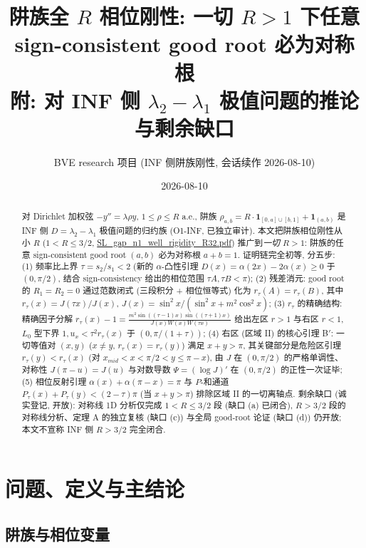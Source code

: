 \documentclass[UTF8]{ctexart}
\title{阱族全 $R$ 相位刚性: 一切 $R>1$ 下任意 sign-consistent good root 必为对称根\\[-2mm]
\large 附: 对 INF 侧 $\lambda_2-\lambda_1$ 极值问题的推论与剩余缺口}
\author{BVE research 项目 (INF 侧阱族刚性, 会话续作 2026-08-10)}
\date{2026-08-10}
\begin{document}
\maketitle

\begin{abstract}
对 Dirichlet 加权弦 $-y''=\lambda\rho y$, $1\le\rho\le R$ a.e., 阱族
$\rho_{a,b}=R\cdot\mathbf 1_{[0,a]\cup[b,1]}+\mathbf 1_{(a,b)}$ 是 INF 侧 $D=\lambda_2-\lambda_1$
极值问题的归约族 (O1-INF, 已独立审计). 本文把阱族相位刚性从小 $R$ ($1<R\le3/2$,
\url{SL\_gap\_n1\_well\_rigidity\_R32.pdf}) 推广到\emph{一切} $R>1$:
阱族的任意 sign-consistent good root $(a,b)$ 必为对称根 $a+b=1$.
证明链完全初等, 分五步:
(1) 频率比上界 $\tau=s_2/s_1<2$ (新的 $\alpha$-凸性引理 $D(x)=\alpha(2x)-2\alpha(x)\ge0$ 于
$(0,\pi/2)$, 结合 sign-consistency 给出的相位范围 $\tau A,\tau B<\pi$);
(2) 残差消元: good root 的 $R_1=R_2=0$ 通过范数闭式 (三段积分 + 相位恒等式) 化为
$r_\tau(A)=r_\tau(B)$, 其中 $r_\tau(x)=J(\tau x)/J(x)$, $J(x)=\sin^2x/(\sin^2x+m^2\cos^2x)$;
(3) $r_\tau$ 的精确结构: 精确因子分解
$r_\tau(x)-1=\frac{m^2\sin((\tau-1)x)\sin((\tau+1)x)}{J(x)W(x)W(\tau x)}$ 给出左区 $r>1$ 与右区 $r<1$,
$L_0$ 型下界 $1,u_x<\tau^2r_\tau(x)$ 于 $(0,\pi/(1+\tau))$;
(4) 右区 (区域 II) 的核心引理 B$'$: 一切等值对 $(x,y)$ ($x\ne y$, $r_\tau(x)=r_\tau(y)$) 满足
$x+y>\pi$, 其关键部分是危险区引理 $r_\tau(y)<r_\tau(x)$ (对
$x_{mid}<x<\pi/2<y\le\pi-x$), 由 $J$ 在 $(0,\pi/2)$ 的严格单调性、对称性
$J(\pi-u)=J(u)$ 与对数导数 $\Psi=(\log J)'$ 在 $(0,\pi/2)$ 的正性一次证毕;
(5) 相位反射引理 $\alpha(x)+\alpha(\pi-x)=\pi$ 与 $P$-和通道
$P_\tau(x)+P_\tau(y)<(2-\tau)\pi$ (当 $x+y>\pi$) 排除区域 II 的一切离轴点.
剩余缺口 (诚实登记, 开放): 对称线 1D 分析仅完成 $1<R\le3/2$ 段 (缺口 (a) 已闭合),
$R>3/2$ 段的对称线分析、定理 A 的独立复核 (缺口 (c)) 与全局 good-root 论证 (缺口 (d))
仍开放; 本文不宣称 INF 侧 $R>3/2$ 完全闭合.
\end{abstract}

\tableofcontents

\section{问题、定义与主结论}\label{sec:setup}

\subsection{阱族与相位变量}
\end{document}
